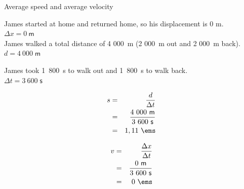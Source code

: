 \begin{wex}{Average speed and average velocity}
{
James started at home and returned home, so his displacement is 0 m.\\
$\Delta x = 0\ \mathsf{m}$\\
James walked a total distance of 4 000~m (2 000~m out and 2 000~m back).\\
$d = 4\ 000\;\mathsf{m}$

James took 1~800~s to walk out and 1~800~s to walk back.\\
$\Delta t = 3\ 600\;\mathsf{s}$

\begin{eqnarray*}
s&=&\frac{d}{\Delta t}\\
&=&\frac{4\ 000\ \mathsf{m}}{3\ 600\ \mathsf{s}}\\
&=&1,11\ \ems
\end{eqnarray*}

\begin{eqnarray*}
{v}&=&\frac{\Delta x}{\Delta t}\\
&=&\frac{0\ \mathsf{m}}{3\ 600\ \mathsf{s}}\\
&=& 0\ \ems
\end{eqnarray*}}
\end{wex}
    \noindent
      \label{m38791*uid37}
